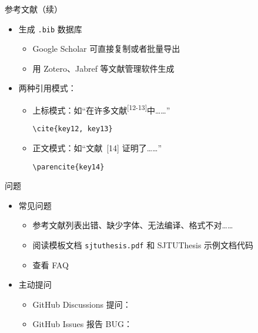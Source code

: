 \begin{frame}[fragile]{参考文献（续）}
  \begin{itemize}
    \item 生成 \verb|.bib| 数据库
          \begin{itemize}
            \item Google Scholar 可直接复制或者批量导出
            \item 用 Zotero、Jabref 等文献管理软件生成
          \end{itemize}
    \item 两种引用模式：
          \begin{itemize}
            \item 上标模式：如“在许多文献\textsuperscript{[12-13]}中……”
                  \begin{lstlisting}[basicstyle=\ttfamily]
    \cite{key12, key13}
          \end{lstlisting}
            \item 正文模式：如“文献~[14] 证明了……”
                  \begin{lstlisting}[basicstyle=\ttfamily]
    \parencite{key14}
          \end{lstlisting}
          \end{itemize}
  \end{itemize}
\end{frame}

\begin{frame}[fragile]{\SJTUThesis 问题}
  \begin{itemize}
    \item 常见问题
          \begin{itemize}
            \item 参考文献列表出错、缺少字体、无法编译、格式不对……
            \item 阅读模板文档 \verb|sjtuthesis.pdf| 和 SJTUThesis 示例文档代码
            \item 查看 FAQ 
          \end{itemize}
    \item 主动提问
          \begin{itemize}
            \item GitHub Discussions 提问：
            \item GitHub Issues 报告 BUG：
          \end{itemize}
  \end{itemize}
\end{frame}
